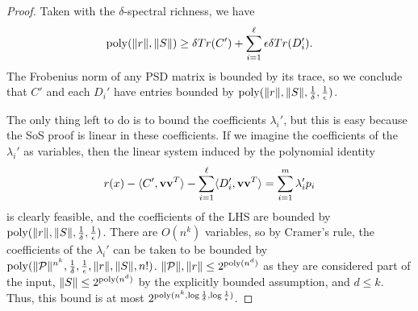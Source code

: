 \begin{proof}
Taken with the $\delta$-spectral richness, we have
\[\operatorname{poly}(\|r\|,\|S\|) \geq \delta Tr(C') + \sum_{i=1}^\ell \epsilon\delta Tr(D_i').\]
The Frobenius norm of any PSD matrix is bounded by its trace, so we conclude that $C'$ and each $D_i'$ have entries bounded by $\operatorname{poly}(\|r\|, \|S\|, \frac{1}{\delta}, \frac{1}{\epsilon})$.

The only thing left to do is to bound the coefficients $\lambda_i'$, but this is easy because the SoS proof is linear in these coefficients. If we imagine the coefficients of the $\lambda_i'$ as variables, then the linear system induced by the polynomial identity
\[r(x) - \langle C', {\bf v}{\bf v}^T\rangle - \sum_{i=1}^\ell \langle D_i', {\bf v}{\bf v}^T\rangle = \sum_{i=1}^m \lambda_i' p_i\]
is clearly feasible, and the coefficients of the LHS are bounded by $\operatorname{poly}(\|r\|, \|S\|, \frac{1}{\delta}, \frac{1}{\epsilon})$. There are $O(n^k)$ variables, so by Cramer's rule, the coefficients of the $\lambda_i'$ can be taken to be bounded by $\operatorname{poly}(\|\mathcal P\|^{n^k}, \frac{1}{\delta}, \frac{1}{\epsilon}, \|r\|, \|S\|, n!)$. $\|\mathcal P\|, \|r\| \leq 2^{\operatorname{poly}(n^d)}$ as they are considered part of the input, $\|S\| \leq 2^{\operatorname{poly}(n^d)}$ by the explicitly bounded assumption, and $d \leq k$. Thus, this bound is at most $2^{\operatorname{poly}(n^k, \log \frac{1}{\delta}, \log \frac{1}{\epsilon})}$.



\end{proof}
